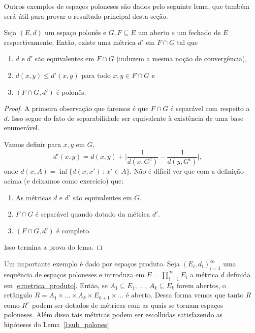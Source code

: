 Outros exemplos de espaços poloneses são dados pelo seguinte lema, que também será útil para provar o resultado principal desta seção.

\begin{lemma}
  \label{l:sub_polones}
  Seja $(E,d)$ um espaço polonês e $G, F \subseteq E$ um aberto e um fechado de $E$ respectivamente.
  Então, existe uma métrica $d'$ em $F \cap G$ tal que
  \begin{enumerate}[\quad a)]
  \item $d$ e $d'$ são equivalentes em $F \cap G$ (induzem a mesma noção de convergência),
  \item $d(x,y) \leq d'(x,y)$ para todo $x, y \in F \cap G$ e
  \item $(F \cap G, d')$ é polonês.
  \end{enumerate}
\end{lemma}

\begin{proof}
  A primeira observação que faremos é que $F \cap G$ é separável com respeito a $d$.
  Isso segue do fato de separabilidade ser equivalente à existência de uma base enumerável.

  Vamos definir para $x, y$ em $G$,
  \begin{equation}
    d'(x,y) = d(x,y) + \Big| \frac{1}{d(x,G^c)} - \frac{1}{d(y,G^c)} \Big|,
  \end{equation}
  onde $d(x,A) = \inf\{d(x,x')\, : \, x' \in A\}$.
Não é difícil ver que com a definição acima (e deixamos como exercício) que:
  \begin{enumerate}[\quad a)]
  \item As métricas $d$ e $d'$ são equivalentes em $G$.
  \item $F \cap G$ é separável quando dotado da métrica $d'$.
  \item $(F \cap G, d')$ é completo.
  \end{enumerate}
  Isso termina a prova do lema.
\end{proof}

\begin{example}
  Um importante exemplo é dado por espaços produto.
  Seja $(E_i, d_i)_{i=1}^\infty$ uma sequência de espaços poloneses e introduza em
  $E = \prod_{i=1}^{\infty} E_i$ a métrica $d$ definida em \eqref{e:metrica_produto}.
  Então, se $A_1 \subseteq E_1$, $\dots$, $A_k \subseteq E_k$ forem abertos, o retângulo $R = A_1 \times \dots \times A_k \times E_{k+1} \times \dots$ é aberto.
  Dessa forma vemos que tanto $R$ como $R^c$ podem ser dotados de métricas com as quais se tornam espaços poloneses.
  Além disso tais métricas podem ser escolhidas satisfazendo as hipóteses do Lema~\ref{l:sub_polones}
\end{example}

